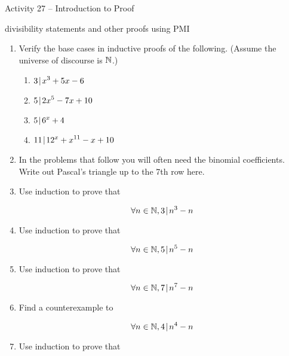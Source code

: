 \documentclass{amsart}
\newcommand{\vsp}{\rule[-12pt]{0pt}{48pt}}
\begin{document}
\thispagestyle{empty}

\centerline{\Large Activity 27 -- Introduction to Proof}
\centerline{\large divisibility statements and other proofs using PMI}

\bigskip
\Large


\begin{enumerate}

\item Verify the base cases in inductive proofs of the following.  (Assume the universe of discourse is ${\mathbb N}$.)

\begin{enumerate}
	\item \vsp $\displaystyle 3 \!\mid\! x^3 + 5x - 6$
	\item \vsp $\displaystyle 5 \!\mid\! 2x^5 - 7x + 10$
	\item \vsp $\displaystyle 5 \!\mid\! 6^x + 4$
	\item \vsp $\displaystyle 11 \!\mid\! 12^x + x^{11} - x + 10$
\end{enumerate}

\vsp

\item In the problems that follow you will often need the binomial coefficients.  Write out Pascal's triangle up to the 7th row here.

\vfill

\newpage

\item Use induction to prove that

\[ \forall n \in {\mathbb N},  3 \!\mid\! n^3 - n \]

\vfill

\item Use induction to prove that

\[ \forall n \in {\mathbb N},  5 \!\mid\! n^5 - n \]

\vfill

\newpage

\item Use induction to prove that

\[ \forall n \in {\mathbb N},  7 \!\mid\! n^7 - n \]

\vfill

\item Find a counterexample to

\[ \forall n \in {\mathbb N},  4 \!\mid\! n^4 - n \]

\vfill

\newpage

\item Use induction to prove that


\end{enumerate}
\end{document}
